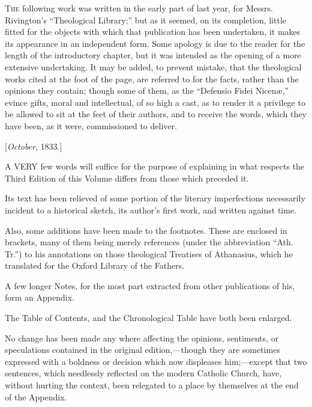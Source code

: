 



T\textsc{he} following work was written in the early
part of last year, for Messrs. Rivington's ``Theological Library;'' but as it seemed, on its completion, little fitted for the
objects with which that publication has been undertaken, it makes its
appearance in an independent form. Some apology is due to the reader
for the length of the introductory chapter, but it was intended as the
opening of a more extensive undertaking. It may be added, to prevent
mistake, that the theological works cited at the foot of the page, are
referred to for the facts, rather than the opinions they contain;
though some of them, as the ``Defensio Fidei Nicenæ,'' evince
gifts, moral and intellectual, of so high a cast, as to render it a
privilege to be allowed to sit at the feet of their authors, and to
receive the words, which they have been, as it were, commissioned to
deliver.


[\emph{October}, 1833.]








A VERY few words will suffice for the purpose
of explaining in what respects the Third Edition of this Volume
differs from those which preceded it.


Its text has been relieved of some portion of the literary
imperfections necessarily incident to a historical sketch, its author's
first work, and written against time.


Also, some additions have been made to the footnotes. These are
enclosed in brackets, many of them being merely references (under the
abbreviation ``Ath. Tr.'') to his annotations on those
theological Treatises of Athanasius, which he translated for the
Oxford Library of the Fathers.


A few longer Notes, for the most part extracted from other
publications of his, form an Appendix.


The Table of Contents, and the Chronological Table have both been
enlarged.


No change has been made any where affecting the opinions,
sentiments, or speculations contained in the original edition,—though
they are sometimes expressed with a boldness or decision which now
displeases him;—except that two sentences, which needlessly
reflected on the modern Catholic Church, have, without hurting the
context, been relegated to a place by themselves at the end of the Appendix.


